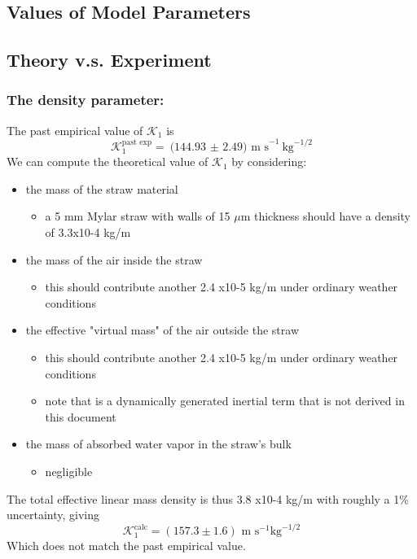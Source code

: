 \documentclass[twoside]{article}
\begin{document}
\begin{multicols}{2}
\newpage
\section{Values of Model Parameters}
\subsection{Theory v.s. Experiment}
\label{sec:prop}
\subsubsection{The density parameter:} 
The past empirical value of $\mathcal{K}_1$ is 
\begin{equation}
\mathcal{K}^\text{past exp}_1  = \text{(144.93 $\pm$ 2.49) m s}^{-1} \text{kg}^{-1/2}
\end{equation}
We can compute the theoretical value of $\mathcal{K}_1$ by considering:
\begin{itemize}
	\item the mass of the straw material
	\begin{itemize}
		\item a 5 mm Mylar straw with walls of 15 $\mu$m thickness should have a density of 3.3x10-4 kg/m 
	\end{itemize}
	\item the mass of the air inside the straw
	\begin{itemize}
		\item this should contribute another 2.4 x10-5 kg/m under ordinary weather conditions
	\end{itemize}
	\item the effective "virtual mass" of the air outside the straw
	\begin{itemize}
		\item this should contribute another 2.4 x10-5 kg/m under ordinary weather conditions
		\item note that is a dynamically generated inertial term that is not derived in this document
	\end{itemize}
	\item the mass of absorbed water vapor in the straw's bulk
	\begin{itemize}
		\item negligible
	\end{itemize}
\end{itemize}
The total effective linear mass density is thus 3.8 x10-4 kg/m with roughly a 1\% uncertainty, giving
\begin{equation}
\mathcal{K}^\text{calc}_1 = (157.3 \pm 1.6) \text{ m s}^{-1} \text{kg}^{-1/2}
\end{equation}
Which does not match the past empirical value.


\end{multicols}
\end{document}
